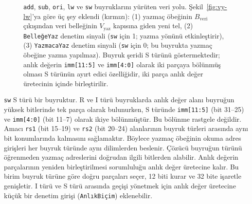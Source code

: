 \begin{figure}[htbp]
\caption[\texttt{add}, \texttt{sub}, \texttt{ori}, \texttt{lw} ve \texttt{sw} buyruklarını yürüten veri yolu]{\texttt{add}, \texttt{sub}, \texttt{ori}, \texttt{lw} ve \texttt{sw} buyruklarını yürüten veri yolu. Şekil~\ref{fig:vy-lw}'ya göre üç şey eklendi (kırmızı): (1) yazmaç öbeğinin $B_{\text{veri}}$ çıkışından veri belleğinin $V_{\text{yaz}}$ kapısına giden yeni tel, (2) \texttt{BelleğeYaz} denetim sinyali (\texttt{sw} için 1; yazma yönünü etkinleştirir), (3) \texttt{YazmacaYaz} denetim sinyali (\texttt{sw} için 0; bu buyrukta yazmaç öbeğine yazma yapılmaz). Buyruk şeridi S türünü göstermektedir; anlık değerin \texttt{imm[11:5]} ve \texttt{imm[4:0]} olarak iki parçaya bölünmüş olması S türünün ayırt edici özelliğidir, iki parça anlık değer üretecinin içinde birleştirilir.}
\label{fig:vy-sw}
\end{figure}

\texttt{sw} S türü bir buyruktur. R ve I türü buyruklarda anlık değer alanı buyruğun yüksek bitlerinde tek parça olarak bulunurken, S türünde \texttt{imm[11:5]} (bit 31--25) ve \texttt{imm[4:0]} (bit 11--7) olarak ikiye bölünmüştür. Bu bölünme rastgele değildir. Amacı \texttt{rs1} (bit 15--19) ve \texttt{rs2} (bit 20--24) alanlarının buyruk türleri arasında aynı bit konumlarında kalmasını sağlamaktır. Böylece yazmaç öbeğinin okuma adres girişleri her buyruk türünde aynı dilimlerden beslenir. Çözücü buyruğun türünü öğrenmeden yazmaç adreslerini doğrudan ilgili bitlerden alabilir. Anlık değerin parçalarının yeniden birleştirilmesi sorumluluğu anlık değer üretecine kalır. Bu birim buyruk türüne göre doğru parçaları seçer, 12 biti kurar ve 32 bite işaretle genişletir. I türü ve S türü arasında geçişi yönetmek için anlık değer üretecine küçük bir denetim girişi (\texttt{AnlıkBiçim}) eklenebilir.

